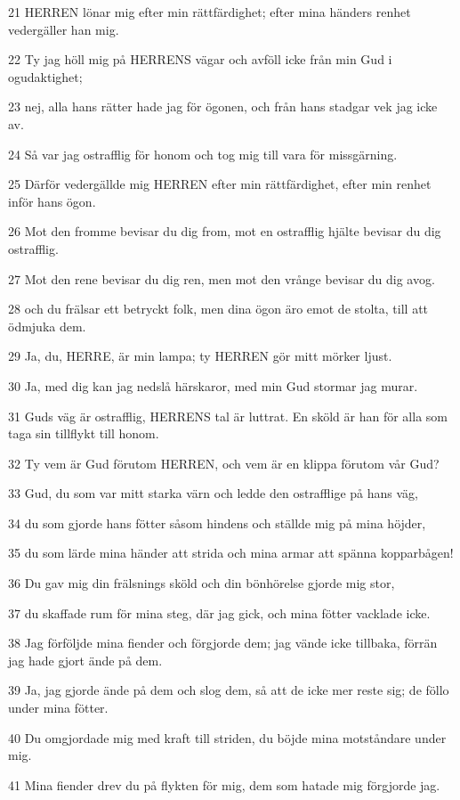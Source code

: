 \par 21 HERREN lönar mig efter min rättfärdighet; efter mina händers renhet vedergäller han mig.
\par 22 Ty jag höll mig på HERRENS vägar och avföll icke från min Gud i ogudaktighet;
\par 23 nej, alla hans rätter hade jag för ögonen, och från hans stadgar vek jag icke av.
\par 24 Så var jag ostrafflig för honom och tog mig till vara för missgärning.
\par 25 Därför vedergällde mig HERREN efter min rättfärdighet, efter min renhet inför hans ögon.
\par 26 Mot den fromme bevisar du dig from, mot en ostrafflig hjälte bevisar du dig ostrafflig.
\par 27 Mot den rene bevisar du dig ren, men mot den vrånge bevisar du dig avog.
\par 28 och du frälsar ett betryckt folk, men dina ögon äro emot de stolta, till att ödmjuka dem.
\par 29 Ja, du, HERRE, är min lampa; ty HERREN gör mitt mörker ljust.
\par 30 Ja, med dig kan jag nedslå härskaror, med min Gud stormar jag murar.
\par 31 Guds väg är ostrafflig, HERRENS tal är luttrat. En sköld är han för alla som taga sin tillflykt till honom.
\par 32 Ty vem är Gud förutom HERREN, och vem är en klippa förutom vår Gud?
\par 33 Gud, du som var mitt starka värn och ledde den ostrafflige på hans väg,
\par 34 du som gjorde hans fötter såsom hindens och ställde mig på mina höjder,
\par 35 du som lärde mina händer att strida och mina armar att spänna kopparbågen!
\par 36 Du gav mig din frälsnings sköld och din bönhörelse gjorde mig stor,
\par 37 du skaffade rum för mina steg, där jag gick, och mina fötter vacklade icke.
\par 38 Jag förföljde mina fiender och förgjorde dem; jag vände icke tillbaka, förrän jag hade gjort ände på dem.
\par 39 Ja, jag gjorde ände på dem och slog dem, så att de icke mer reste sig; de föllo under mina fötter.
\par 40 Du omgjordade mig med kraft till striden, du böjde mina motståndare under mig.
\par 41 Mina fiender drev du på flykten för mig, dem som hatade mig förgjorde jag.
